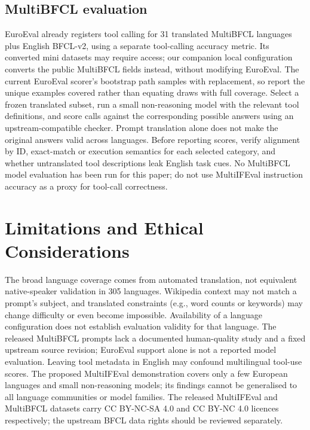 \documentclass[11pt]{article}
\begin{document}
\subsection{MultiBFCL evaluation}

EuroEval already registers tool calling for 31 translated MultiBFCL languages
plus English BFCL-v2, using a separate tool-calling accuracy metric. Its
converted mini datasets may require access; our companion local configuration
converts the public MultiBFCL fields instead, without modifying EuroEval.
The current EuroEval scorer's bootstrap path samples with replacement, so
report the unique examples covered rather than equating draws with full coverage.
Select a frozen translated subset, run a small non-reasoning model with the
relevant tool definitions, and score calls against the corresponding possible
answers using an upstream-compatible checker. Prompt translation alone does not make the
original answers valid across languages. Before reporting scores, verify
alignment by ID, exact-match or execution semantics for each selected category,
and whether untranslated tool descriptions leak English task cues. No MultiBFCL
model evaluation has been run for this paper; do not use MultiIFEval instruction
accuracy as a proxy for tool-call correctness.

\section{Limitations and Ethical Considerations}
\label{sec:limitations}

The broad language coverage comes from automated translation, not equivalent
native-speaker validation in 305 languages. Wikipedia context may not match a
prompt's subject, and translated constraints (e.g., word counts or keywords)
may change difficulty or even become impossible. Availability of a language
configuration does not establish evaluation validity for that language.
The released MultiBFCL prompts lack a documented human-quality study and a
fixed upstream source revision; EuroEval support alone is not a reported model
evaluation. Leaving tool metadata in English may confound multilingual tool-use
scores. The proposed MultiIFEval demonstration covers only a few European
languages and small non-reasoning models; its findings cannot be generalised
to all language communities or model families. The released MultiIFEval and MultiBFCL datasets carry CC BY-NC-SA 4.0 and
CC BY-NC 4.0 licences respectively; the upstream BFCL data rights should be
reviewed separately.
\end{document}
